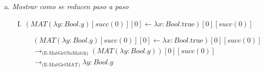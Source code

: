 \documentclass[10pt, a4paper]{article}
\newcommand{\abs}[3]{\ensuremath{\lambda#1:#2.#3}}
\newcommand{\MAT}[1]{\text{MAT}(#1)}
\newcommand{\MatGet}[3]{#1[#2][#3]}
\newcommand{\MatSet}[4]{\MatGet{#1}{#2}{#3} \leftarrow #4}
\begin{document}
\begin{enumerate}[a)]
\[
    \trfrac[(E-MatSetC)] {
        M_1 \to M_1'
    }{
        \MatSet{M_1}{X}{Y}{M_2} \to \MatSet{M_1'}{X}{Y}{M_2}
    }
\]
\[
    \trfrac[(E-MatSetXC)] {
        N \to N'
    }{
        \MatSet{M_1}{N}{O}{M_2} \to \MatSet{M_1}{N'}{O}{M_2}
    }
\]
\[
    \trfrac[(E-MatSetYC)] {
        O \to O'
    }{
        \MatSet{M_1}{N}{O}{M_2} \to \MatSet{M_1}{N}{O'}{M_2}
    }
\]
\[
    \trfrac[(E-MatGetNoMatch)]{
    }{
        \MatGet{(\MatSet{V}{I}{J}{M})}{X}{Y} \to \MatGet{V}{X}{Y}
    }
\]
\[
    \trfrac[(E-MatGetXC)]{
        N \to N'
    }{
        \MatGet{M}{N}{O} \to \MatGet{M}{N'}{O}
    }
\]
\[
    \trfrac[(E-MatGetYC)]{
        O \to O'
    }{
        \MatGet{M}{X}{O} \to \MatGet{M}{X}{O'}
    }
\]
\[
    \trfrac[(E-MatGetC)]{
        M \to M'
    }{
        \MatGet{M}{X}{Y} \to \MatGet{M'}{X}{Y}
    }
\]
\[
    \trfrac[(E-MatGetSetC)]{
        M \to M'
    }{
        \MatGet{(\MatSet{V}{X}{Y}{M})}{X}{Y} \to \MatGet{(\MatSet{V}{X}{Y}{M'})}{X}{Y}
    }
\]
\[
    \trfrac[(E-MatGetMATC)]{
        M \to M'
    }{
        \MatGet{(\MAT{M})}{X}{Y} \to \MatGet{(\MAT{M'})}{X}{Y}
    }
\]
\[
    \trfrac[(E-MatGetMAT)]{
    }{
        \MatGet{(\MAT{V})}{X}{Y} \to V
    }
\]
\[
    \trfrac[(E-MatGetSet)]{
    }{
        \MatGet{(\MatSet{V}{X}{Y}{W})}{X}{Y} \to W
    }
\]
\[
    \trfrac[(E-MatMapCF)]{
        F \to F'
    }{
        map(M, F) \to map(M, F')
    }
\]
\[
    \trfrac[(E-MatMapCM)]{
        M \to M'
    }{
        map(M, F) \to map(M', F)
    }
\]
\[
    \trfrac[(E-MatMapMAT)]{
    }{
        map(MAT[M], F) \to MAT(F M)
    }
\]
\[
    \trfrac[(E-MatMapSet)]{
    }{
        map(\MatSet{V}{X}{Y}{M}, F) \to \MatSet{map(V, F)}{X}{Y}{F\ M}
    }
\]

TODO: para matcheo de indices no vale poner la misma letra, hay que preguntar por igualdad sintactica con $\equiv$, como dice el enunciado.

\item \textit{Mostrar como se reducen paso a paso}

\begin{enumerate}[I)]
    \item $\MatGet{ (\MatSet{MAT(\abs{y}{Bool}{y})}{succ(0)}{0}{\abs{x}{Bool}{\text{true}}}) }{0}{succ(0)}$
    
    \begin{align*}
        &\MatGet{ (\MatSet{MAT(\abs{y}{Bool}{y})}{succ(0)}{0}{\abs{x}{Bool}{\text{true}}}) }{0}{succ(0)}\\
        &\to_\text{(E-MatGetNoMatch)}
            \MatGet{(MAT(\abs{y}{Bool}{y})) }{0}{succ(0)}\\
        &\to_\text{(E-MatGetMAT)}
            \abs{y}{Bool}{y}
    \end{align*}


\end{enumerate}
\end{enumerate}
\end{document}
